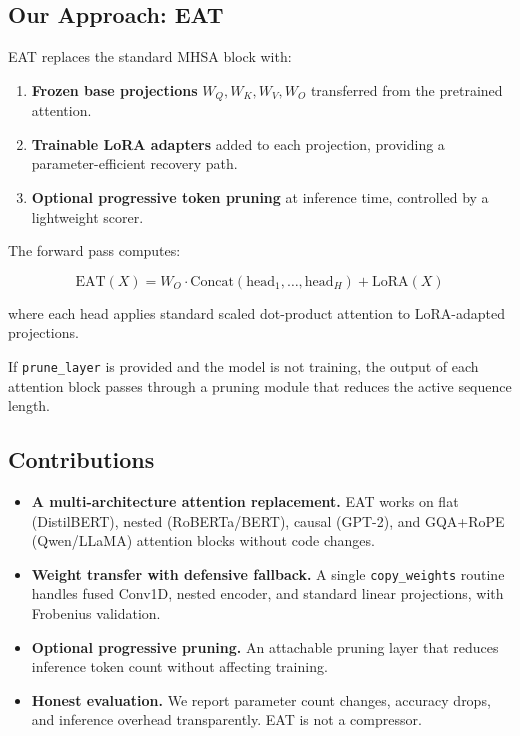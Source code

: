 \subsection{Our Approach: EAT}

EAT replaces the standard MHSA block with:

\begin{enumerate}
\item \textbf{Frozen base projections} $W_Q, W_K, W_V, W_O$ transferred from the
  pretrained attention.
\item \textbf{Trainable LoRA adapters} added to each projection, providing a
  parameter-efficient recovery path.
\item \textbf{Optional progressive token pruning} at inference time, controlled by
  a lightweight scorer.

\end{enumerate}
The forward pass computes:

\[
\text{EAT}(X) = W_O \cdot \text{Concat}(\text{head}_1, \dots, \text{head}_H) + \text{LoRA}(X)
\tag{1.1}
\]

where each head applies standard scaled dot-product attention to 
LoRA-adapted projections.

If \texttt{prune\_layer} is provided and the model is not training, the output of 
each attention block passes through a pruning module that reduces the active 
sequence length.

\subsection{Contributions}

\begin{itemize}
\item \textbf{A multi-architecture attention replacement.} EAT works on flat
  (DistilBERT), nested (RoBERTa/BERT), causal (GPT-2), and GQA+RoPE
  (Qwen/LLaMA) attention blocks without code changes.
\item \textbf{Weight transfer with defensive fallback.} A single \texttt{copy\_weights}
  routine handles fused Conv1D, nested encoder, and standard linear
  projections, with Frobenius validation.
\item \textbf{Optional progressive pruning.} An attachable pruning layer that reduces
  inference token count without affecting training.
\item \textbf{Honest evaluation.} We report parameter count changes, accuracy drops,
  and inference overhead transparently. EAT is not a compressor.

\end{itemize}
